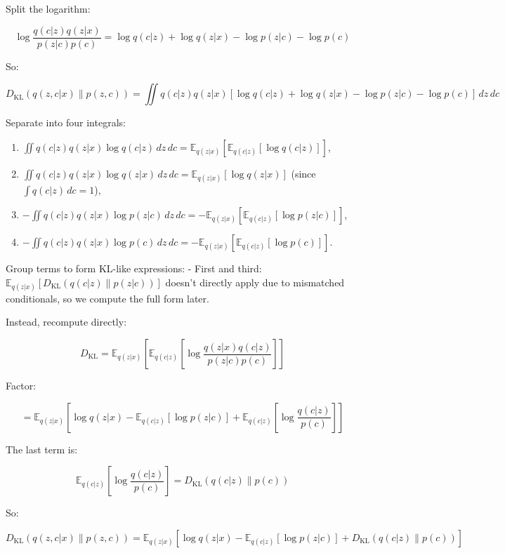 \documentclass[12pt]{article}
\numberwithin{equation}{section}
\begin{document}
Split the logarithm:

\[
\log \frac{q(c | z) q(z | x)}{p(z | c) p(c)} = \log q(c | z) + \log q(z | x) - \log p(z | c) - \log p(c)
\]

So:

\[
D_{\text{KL}}(q(z, c | x) \| p(z, c)) = \iint q(c | z) q(z | x) \left[ \log q(c | z) + \log q(z | x) - \log p(z | c) - \log p(c) \right] \, dz \, dc
\]

Separate into four integrals:
\begin{enumerate}
    \item \(\iint q(c | z) q(z | x) \log q(c | z) \, dz \, dc = \mathbb{E}_{q(z | x)} \left[ \mathbb{E}_{q(c | z)} \left[ \log q(c | z) \right] \right]\),
    \item \(\iint q(c | z) q(z | x) \log q(z | x) \, dz \, dc = \mathbb{E}_{q(z | x)} \left[ \log q(z | x) \right]\) (since \(\int q(c | z) \, dc = 1\)),
    \item \(-\iint q(c | z) q(z | x) \log p(z | c) \, dz \, dc = -\mathbb{E}_{q(z | x)} \left[ \mathbb{E}_{q(c | z)} \left[ \log p(z | c) \right] \right]\),
    \item \(-\iint q(c | z) q(z | x) \log p(c) \, dz \, dc = -\mathbb{E}_{q(z | x)} \left[ \mathbb{E}_{q(c | z)} \left[ \log p(c) \right] \right]\).
\end{enumerate}

Group terms to form KL-like expressions:
- First and third: \(\mathbb{E}_{q(z | x)} \left[ D_{\text{KL}}(q(c | z) \| p(z | c)) \right]\) doesn’t directly apply due to mismatched conditionals, so we compute the full form later.

Instead, recompute directly:

\[
D_{\text{KL}} = \mathbb{E}_{q(z | x)} \left[ \mathbb{E}_{q(c | z)} \left[ \log \frac{q(z | x) q(c | z)}{p(z | c) p(c)} \right] \right]
\]

Factor:

\[
= \mathbb{E}_{q(z | x)} \left[ \log q(z | x) - \mathbb{E}_{q(c | z)} \left[ \log p(z | c) \right] + \mathbb{E}_{q(c | z)} \left[ \log \frac{q(c | z)}{p(c)} \right] \right]
\]

The last term is:

\[
\mathbb{E}_{q(c | z)} \left[ \log \frac{q(c | z)}{p(c)} \right] = D_{\text{KL}}(q(c | z) \| p(c))
\]

So:

\[
D_{\text{KL}}(q(z, c | x) \| p(z, c)) = \mathbb{E}_{q(z | x)} \left[ \log q(z | x) - \mathbb{E}_{q(c | z)} \left[ \log p(z | c) \right] + D_{\text{KL}}(q(c | z) \| p(c)) \right]
\]
\end{document}
